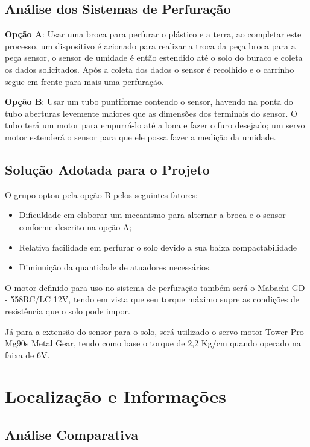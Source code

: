   \subsection{Análise dos Sistemas de Perfuração}

  \textbf{Opção A}: Usar uma broca para perfurar o plástico e a terra, ao completar este
  processo, um dispositivo é acionado para realizar a troca da peça broca para
  a peça sensor, o sensor de umidade é então estendido até o solo do buraco e
  coleta os dados solicitados. Após a coleta dos dados o sensor é recolhido e o
  carrinho segue em frente para mais uma perfuração. 

  \textbf{Opção B}: Usar um tubo puntiforme contendo o sensor, havendo na ponta do tubo
  aberturas levemente maiores que as dimensões dos terminais do sensor. O tubo
  terá um motor para empurrá-lo até a lona e fazer o furo desejado; um servo
  motor estenderá o sensor para que ele possa fazer a medição da umidade.

  \subsection{Solução Adotada para o Projeto}
  
  O grupo optou pela opção B pelos seguintes fatores:

  \begin{itemize}
    \item Dificuldade em elaborar um mecanismo para alternar a broca e o sensor
    conforme descrito na opção A;
    \item Relativa facilidade em perfurar o solo devido a sua baixa compactabilidade
    \item Diminuição da quantidade de atuadores necessários.
  \end{itemize}

	O motor definido para uso no sistema de perfuração também será o
  Mabachi GD - 558RC/LC 12V, tendo em vista que seu torque máximo supre as
  condições de resistência que o solo pode impor.

  Já para a extensão do sensor para o solo, será utilizado o servo motor Tower
  Pro Mg90s Metal Gear, tendo como base o torque de 2,2 Kg/cm quando operado na faixa de 6V.

  \section{Localização e Informações}

  \subsection{Análise Comparativa}

